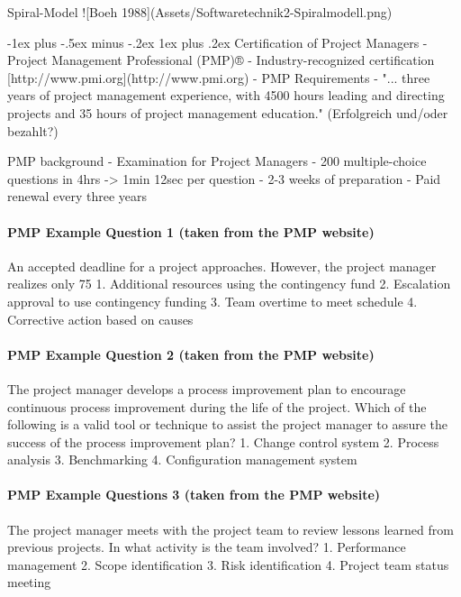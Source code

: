 \documentclass[a4paper]{article}
\makeatletter
\renewcommand{\subsubsection}{\@startsection{subsubsection}{3}{0mm}%
                                {-1ex plus -.5ex minus -.2ex}%
                                {1ex plus .2ex}%
                                {\normalfont\small\bfseries}}
\makeatother
\begin{document}
\begin{multicols}{3}
  Spiral-Model
  ![Boeh 1988](Assets/Softwaretechnik2-Spiralmodell.png)
  
  \subsubsection{Certification of Project Managers}
  - Project Management Professional (PMP)®
  - Industry-recognized certification [http://www.pmi.org](http://www.pmi.org)
  - PMP Requirements
      - "... three years of project management experience, with 4500 hours leading and directing projects and 35 hours of project management education." (Erfolgreich und/oder bezahlt?)
  
  PMP background
  - Examination for Project Managers
      - 200 multiple-choice questions in 4hrs -> 1min 12sec per question
      - 2-3 weeks of preparation
  - Paid renewal every three years
  
  \paragraph{PMP Example Question 1 (taken from the PMP website)}
  An accepted deadline for a project approaches. However, the project manager realizes only 75%
  1. Additional resources using the contingency fund
  2. Escalation approval to use contingency funding
  3. Team overtime to meet schedule
  4. Corrective action based on causes
  
  \paragraph{PMP Example Question 2 (taken from the PMP website)}
  The project manager develops a process improvement plan to encourage continuous process improvement during the life of the project. Which of the following is a valid tool or technique to assist the project manager to assure the success of the process improvement plan?
  1. Change control system
  2. Process analysis
  3. Benchmarking
  4. Configuration management system
  
  \paragraph{PMP Example Questions 3 (taken from the PMP website)}
  The project manager meets with the project team to review lessons learned from previous projects. In what activity is the team involved?
  1. Performance management
  2. Scope identification
  3. Risk identification
  4. Project team status meeting
  

\end{multicols}
\end{document}
